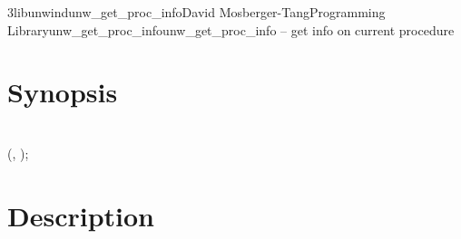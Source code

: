 \documentclass{article}
\begin{document}
\begin{Name}{3libunwind}{unw\_get\_proc\_info}{David Mosberger-Tang}{Programming Library}{unw\_get\_proc\_info}unw\_get\_proc\_info -- get info on current procedure
\end{Name}

\section{Synopsis}

\\

 (, );\\

\section{Description}
\end{document}
